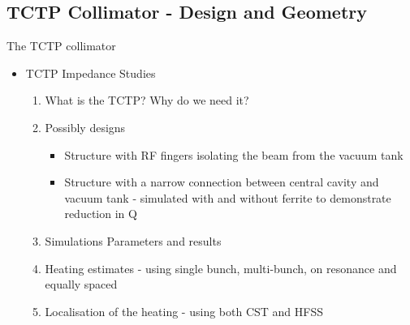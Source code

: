 \subsection{TCTP Collimator - Design and Geometry}

The TCTP collimator

\begin{itemize}
\item{TCTP Impedance Studies}
\begin{enumerate}
\item{What is the TCTP? Why do we need it?}
\item{Possibly designs}
\begin{itemize}
\item{Structure with RF fingers isolating the beam from the vacuum tank}
\item{Structure with a narrow connection between central cavity and vacuum tank - simulated with and without ferrite to demonstrate reduction in Q}
\end{itemize}
\item{Simulations Parameters and results}
\item{Heating estimates - using single bunch, multi-bunch, on resonance and equally spaced}
\item{Localisation of the heating - using both CST and HFSS}

\end{enumerate}
\end{itemize}
%
%
%
%
%
%


